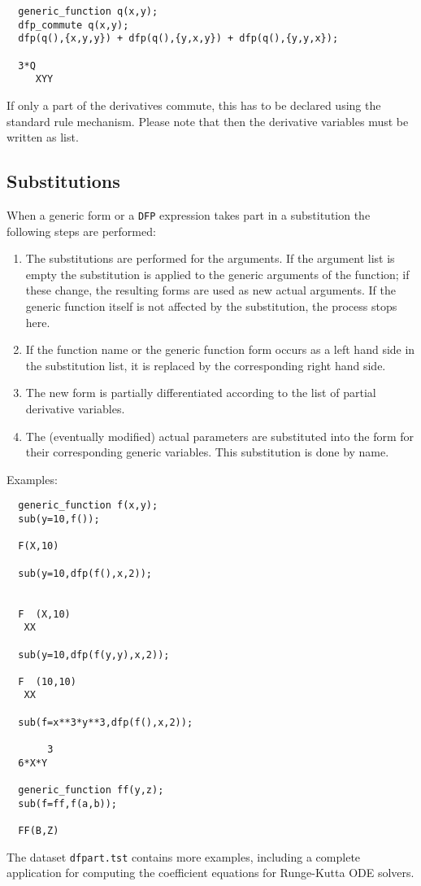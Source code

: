 \begin{verbatim}
  generic_function q(x,y);
  dfp_commute q(x,y);
  dfp(q(),{x,y,y}) + dfp(q(),{y,x,y}) + dfp(q(),{y,y,x});

  3*Q
     XYY
\end{verbatim}

If only a part of the derivatives commute, this has to be
declared using the standard {\REDUCE} rule mechanism. Please
note that then the derivative variables must be written as
list.

\subsection{Substitutions}

When a generic form or a {\tt DFP} expression takes part in a 
substitution the following steps are performed:
\begin{enumerate}
\item The substitutions are performed for the arguments. If the
argument list is empty the substitution is applied to the
generic arguments of the function; if these change, the resulting
forms are used as new actual arguments.
If the generic function itself is not affected by the substitution,
the process stops here.
\item If the function name or the generic function
form occurs as a left hand side in the substitution list,
it is replaced by the corresponding right hand side.
\item The new form is partially differentiated according to the
list of partial derivative variables.
\item The (eventually modified) actual parameters are substituted
into the form for their corresponding generic variables.
This substitution is done by name.
\end{enumerate}

Examples:
\begin{verbatim}
  generic_function f(x,y);
  sub(y=10,f());
 
  F(X,10)

  sub(y=10,dfp(f(),x,2));


  F  (X,10)
   XX

  sub(y=10,dfp(f(y,y),x,2));

  F  (10,10)
   XX

  sub(f=x**3*y**3,dfp(f(),x,2));

       3
  6*X*Y

  generic_function ff(y,z);
  sub(f=ff,f(a,b));

  FF(B,Z)
\end{verbatim}

The dataset \texttt{dfpart.tst} contains more examples,
including a complete application for computing the coefficient
equations for Runge-Kutta ODE solvers.

